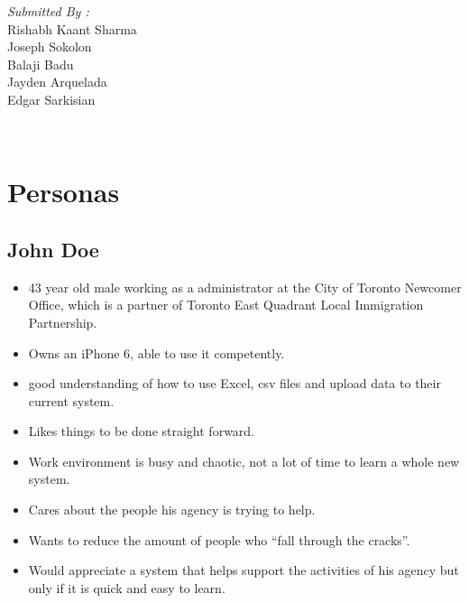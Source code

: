 \documentclass[12pt]{article}
\begin{document}
\begin{titlepage}
\begin{minipage}{0.4\textwidth}
			\begin{flushright} \large
			\emph{Submitted By :} \\
			Rishabh Kaant Sharma\\
            Joseph Sokolon\\
            Balaji Badu\\
            Jayden Arquelada\\
            Edgar Sarkisian\\
		\end{flushright}
        
	\end{minipage}\\[2 cm]
	
	
    
    
    
    
	
\end{titlepage}


\textcolor{black}{\tableofcontents}
\pagebreak


\section{Personas}
\subsection{John Doe}
\begin{itemize}%
\item 43 year old male working as a administrator at the City of Toronto Newcomer Office, which is a partner of Toronto East Quadrant Local Immigration Partnership.
\item Owns an iPhone 6, able to use it competently.
\item good understanding of how to use Excel, csv files and upload data to their current system.
\item Likes things to be done straight forward.
\item Work environment is busy and chaotic, not a lot of time to learn a whole new system.
\item Cares about the people his agency is trying to help.
\item Wants to reduce the amount of people who “fall through the cracks”.
\item Would appreciate a system that helps support the activities of his agency but only if it is quick and easy to learn.

 \end{itemize}
\end{document}
